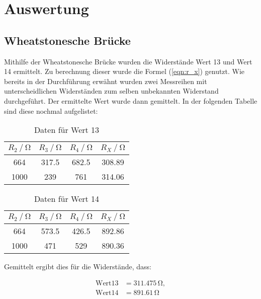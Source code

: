 \section{Auswertung}
\subsection{Wheatstonesche Brücke}
Mithilfe der Wheatstonesche Brücke wurden die Widerstände \glqq Wert 13\grqq{} und \glqq Wert 14\grqq{} ermittelt. Zu berechnung dieser wurde die Formel (\ref{eqn:r_x}) genutzt.
Wie bereits in der Durchführung erwähnt wurden zwei Messreihen mit unterscheidlichen Widerständen zum selben unbekannten Widerstand durchgeführt. Der ermittelte Wert wurde dann gemittelt. In der folgenden Tabelle sind diese 
nochmal aufgelistet:

\begin{table}
\centering
\begin{tabular}{c c c c}
\toprule
{$R_2 \mathbin{/} \si{\ohm} $} & {$R_3 \mathbin{/} \si{\ohm} $} &{$R_4 \mathbin{/} \si{\ohm} $} & {$R_X \mathbin{/} \si{\ohm} $}\\
\midrule
664  &   317.5 &  682.5 & 308.89 \\
1000 &   239   &  761   & 314.06\\
\bottomrule
\end{tabular}
\caption{Daten für Wert 13}
\label{tab:wert13}
\end{table}

\begin{table}
\centering
\begin{tabular}{c c c c}
\toprule
{$R_2 \mathbin{/} \si{\ohm} $} & {$R_3 \mathbin{/} \si{\ohm} $} &{$R_4 \mathbin{/} \si{\ohm} $} & {$R_X \mathbin{/} \si{\ohm} $}\\
\midrule
664  &   573.5 &  426.5 & 892.86   \\
1000 &   471   &  529   & 890.36   \\
\bottomrule
\end{tabular}
\caption{Daten für Wert 14}
\label{tab:wert14}
\end{table}

Gemittelt ergibt dies für die Widerstände, dass:

\begin{align*}
\text{Wert} 13 &= 311.475 \, \si{\ohm}, \\
\text{Wert} 14 &= 891.61 \, \si{\ohm} \\
\end{align*}

